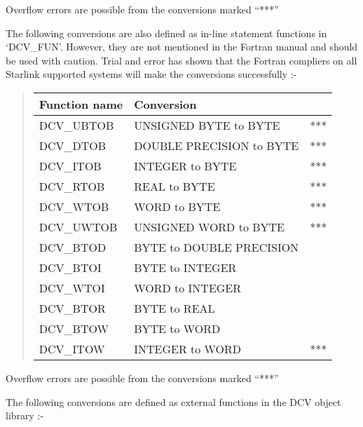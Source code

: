 \documentclass[twoside,11pt,nolof]{starlink}
\begin{document}
Overflow errors are possible from the conversions marked ``***''

\newpage

The following conversions are also defined as in-line statement functions in
`DCV\_FUN'. However, they are not mentioned in the Fortran manual and should be
used with caution. Trial and error has shown that the Fortran compliers on all
Starlink supported systems will make the conversions successfully :-

\begin{quote}
\begin{tabular}{lll}
\textbf{Function name}      &\textbf{Conversion} \\
\hline
DCV\_UBTOB &UNSIGNED BYTE to BYTE          &*** \\
DCV\_DTOB  &DOUBLE PRECISION to BYTE       &*** \\
DCV\_ITOB  &INTEGER to BYTE                &*** \\
DCV\_RTOB  &REAL to BYTE                   &*** \\
DCV\_WTOB  &WORD to BYTE                   &*** \\
DCV\_UWTOB &UNSIGNED WORD to BYTE          &*** \\
DCV\_BTOD  &BYTE to DOUBLE PRECISION \\
DCV\_BTOI  &BYTE to INTEGER \\
DCV\_WTOI  &WORD to INTEGER \\
DCV\_BTOR  &BYTE to REAL \\
DCV\_BTOW  &BYTE to WORD \\
DCV\_ITOW  &INTEGER to WORD                &*** \\
\end{tabular}
\end{quote}

Overflow errors are possible from the conversions marked ``***''

The following conversions are defined as external
functions in the DCV object library :-
\end{document}
